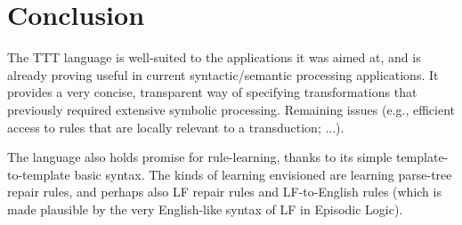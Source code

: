\documentclass[11pt]{article}
\begin{document}
\section{Conclusion}
The TTT language is well-suited to the applications it was aimed at,
and is already proving useful in current syntactic/semantic
processing applications. It provides a very concise, transparent
way of specifying transformations that previously required
extensive symbolic processing. Remaining issues (e.g., efficient access
to rules that are locally relevant to a transduction; ...).

The language also holds promise for rule-learning, thanks to its simple 
template-to-template basic syntax. The kinds of learning envisioned
are learning parse-tree repair rules, and perhaps also LF repair
rules and LF-to-English rules (which is made plausible by the
very English-like syntax of LF in Episodic Logic).
\end{document}
